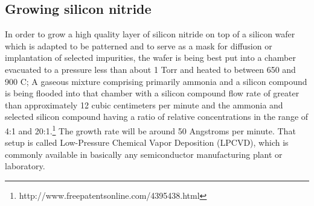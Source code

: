 \subsection{Growing silicon nitride}\label{chemistry_growing_nitride}
In order to grow a high quality layer of silicon nitride on top of a silicon wafer which is adapted to be patterned and to serve as a mask for diffusion or implantation of selected impurities, the wafer is being best put into a chamber evacuated to a pressure less than about 1 Torr and heated to between 650 and 900 \degree C;
A gaseous mixture comprising primarily ammonia and a silicon compound is being flooded into that chamber with a silicon compound flow rate of greater than approximately 12 cubic centimeters per minute and the ammonia and selected silicon compound having a ratio of relative concentrations in the range of 4:1 and 20:1.\footnote{http://www.freepatentsonline.com/4395438.html}
The growth rate will be around 50 Angstroms per minute.
That setup is called Low-Pressure Chemical Vapor Deposition (LPCVD), which is commonly available in basically any semiconductor manufacturing plant or laboratory.
